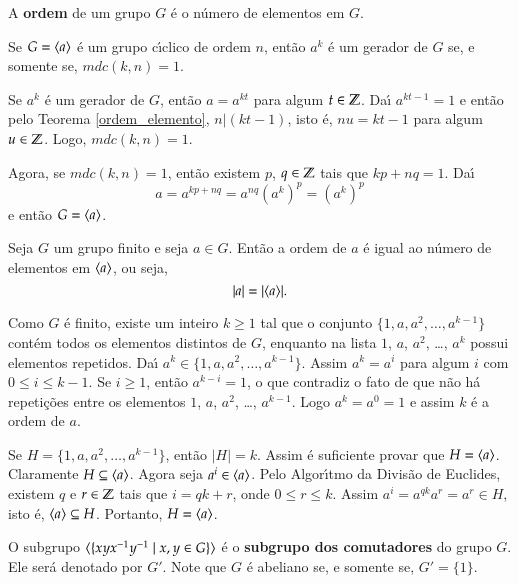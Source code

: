 \begin{definicao}
	A \textbf{ordem} de um grupo $G$ \'e o n\'umero de elementos em $G$.
\end{definicao}
\begin{teorema}
	Se $G = \langle{a}\rangle$ \'e um grupo c{\'\i}clico de ordem $n$, ent\~ao $a^k$ \'e um gerador de $G$ se, e somente se, $mdc(k,n) = 1$.
\end{teorema}
\begin{prova}
	Se $a^k$ \'e um gerador de $G$, ent\~ao $a = a^{kt}$ para algum $t \in \mathbb{Z}$. Da{\'\i} $a^{kt - 1} = 1$ e ent\~ao pelo Teorema \ref{ordem_elemento}, $n | (kt -1)$, isto \'e, $nu = kt - 1$ para algum $u \in \mathbb{Z}$. Logo, $mdc(k,n) = 1$.

	Agora, se $mdc(k,n) = 1$, ent\~ao existem $p$, $q \in \mathbb{Z}$ tais que $kp + nq = 1$. Da{\'\i}
	\[
		a = a^{kp + nq} = a^{nq}(a^k)^p = (a^k)^p
	\]
	e ent\~ao $G = \langle{a}\rangle$.
\end{prova}

\begin{proposicao}\label{ordem_de_elemento}
	Seja $G$ um grupo finito e seja $a \in G$. Ent\~ao a ordem de $a$ \'e igual ao n\'umero de elementos em $\langle{a}\rangle$, ou seja,
	\[
		|a| = |\langle{a}\rangle|.
	\]
\end{proposicao}
\begin{prova}
	Como $G$ \'e finito, existe um inteiro $k \ge 1$ tal que o conjunto $\{1, a, a^2, \dots, a^{k - 1}\}$ cont\'em todos os elementos distintos de $G$, enquanto na lista $1$, $a$, $a^2$, \dots, $a^k$ possui elementos repetidos. Da{\'\i} $a^k \in \{1, a, a^2, \dots, a^{k - 1}\}$. Assim $a^k = a^i$ para algum $i$ com $0 \le i \le k - 1$. Se $i \ge 1$, ent\~ao $a^{k - i} = 1$, o que contradiz o fato de que n\~ao h\'a repeti\c{c}\~oes entre os elementos $1$, $a$, $a^2$, \dots, $a^{k - 1}$. Logo $a^k = a^0 = 1$ e assim $k$ \'e a ordem de $a$.

	Se $H = \{1, a, a^2, \dots, a^{k - 1}\}$, ent\~ao $|H| = k$. Assim \'e suficiente provar que $H = \langle{a}\rangle$. Claramente $H \subseteq \langle{a}\rangle$. Agora seja $a^i \in \langle{a}\rangle$. Pelo Algor{\'\i}tmo da Divis\~ao de Euclides, existem $q$ e $r \in \mathbb{Z}$ tais que $i = qk + r$, onde $0 \le r \le k$. Assim $a^i = a^{qk}a^r = a^r \in H$, isto \'e, $\langle{a}\rangle \subseteq H$. Portanto, $H = \langle{a}\rangle$.
\end{prova}

\begin{definicao}
	O subgrupo $\langle{\{xyx^{-1}y^{-1} \mid x, y \in G\}}\rangle$ \'e o \textbf{subgrupo dos comutadores} do grupo $G$. Ele ser\'a denotado por $G'$. Note que $G$ \'e abeliano se, e somente se, $G' = \{1\}$.
\end{definicao}


